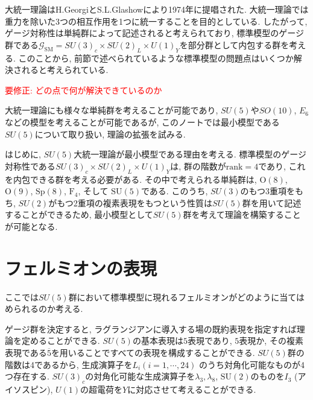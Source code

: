 % 
%
大統一理論はH.GeorgiとS.L.Glashowにより1974年に提唱された\cite{PhysRevLett.32.438}.
大統一理論では重力を除いた3つの相互作用を1つに統一することを目的としている.
したがって, ゲージ対称性は単純群によって記述されると考えられており, 標準模型のゲージ群である$\mathcal{G}_\text{SM}= SU(3)_c\times SU(2)_L\times U(1)_Y$を部分群として内包する群を考える.
このことから, 前節で述べられているような標準模型の問題点はいくつか解決されると考えられている.

\textcolor{red}{要修正: どの点で何が解決できているのか}

大統一理論にも様々な単純群を考えることが可能であり, $SU(5)$や$SO(10)$, $E_6$などの模型を考えることが可能であるが, このノートでは最小模型である$SU(5)$について取り扱い, 理論の拡張を試みる.

はじめに, $SU(5)$大統一理論が最小模型である理由を考える.
標準模型のゲージ対称性である$SU(3)_c\times SU(2)_L\times U(1)_Y$は, 群の階数が$\text{rank}=4$であり, これを内包できる群を考える必要がある.
その中で考えられる単純群は, $\text{O}(8)$, $\mathrm{O}(9)$, $\mathrm{Sp}(8)$, $\mathrm{F}_4$, そして $\mathrm{SU}(5)$である.
このうち, $SU(3)$のもつ3重項をもち, $SU(2)$がもつ2重項の複素表現をもつという性質は$SU(5)$群を用いて記述することができるため, 最小模型として$SU(5)$群を考えて理論を構築することが可能となる.

\section{フェルミオンの表現}
ここでは$SU(5)$群において標準模型に現れるフェルミオンがどのように当てはめられるのか考える.

ゲージ群を決定すると, ラグランジアンに導入する場の既約表現を指定すれば理論を定めることができる.
$SU(5)$の基本表現は$5$表現であり, $5$表現か, その複素表現である$\overline{5}$を用いることですべての表現を構成することができる.
$SU(5)$群の階数は4であるから, 生成演算子を$L_i$$(i=1,\cdots,24)$ のうち対角化可能なものが4つ存在する.
$SU(3)_c$の対角化可能な生成演算子を$\lambda_3,\lambda_8$, $\mathrm{SU}(2)$のものを$I_3$ (アイソスピン), $U(1)$の超電荷を$Y$に対応させて考えることができる.


